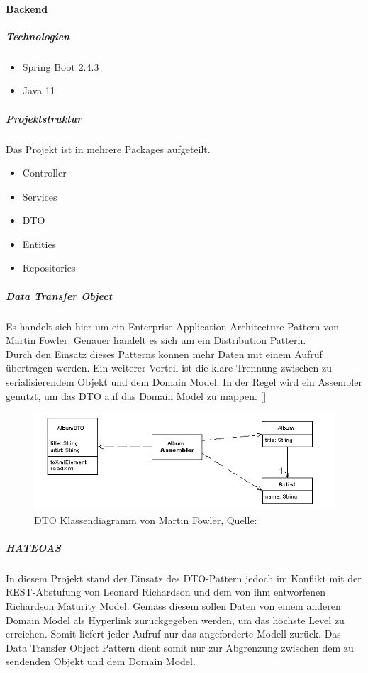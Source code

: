 \paragraph{Backend}
\subparagraph{Technologien}
\begin{itemize}
	\item Spring Boot 2.4.3
	\item Java 11
\end{itemize}
\subparagraph{Projektstruktur}
Das Projekt ist in mehrere Packages aufgeteilt. 
\begin{itemize}
	\item Controller
	\item Services
	\item DTO
	\item Entities
	\item Repositories
\end{itemize}
\newpage
\subparagraph{Data Transfer Object}\label{DTO}
Es handelt sich hier um ein Enterprise Application Architecture Pattern von Martin Fowler. Genauer handelt es sich um ein Distribution Pattern. \\
Durch den Einsatz dieses Patterns können mehr Daten mit einem Aufruf übertragen werden. Ein weiterer Vorteil ist die klare Trennung zwischen zu serialisierendem Objekt und dem Domain Model. In der Regel wird ein Assembler genutzt, um das DTO auf das Domain Model zu mappen. [\cite{dtoFowler}]
\begin{figure}[H]
	\centering
	\includegraphics[width=1\textwidth]{images/dtoSketch.png}
	\caption[DTO Klassendiagramm von Martin Fowler]{DTO Klassendiagramm von Martin Fowler, Quelle: \cite{dtoFowler}}
	\label{img: dtoFowler}
\end{figure}
\subparagraph{\ac{HATEOAS}}
In diesem Projekt stand der Einsatz des DTO-Pattern jedoch im Konflikt mit der REST-Abstufung von Leonard Richardson und dem von ihm entworfenen Richardson Maturity Model. Gemäss diesem sollen Daten von einem anderen Domain Model als Hyperlink zurückgegeben werden, um das höchste Level zu erreichen. Somit liefert jeder Aufruf nur das angeforderte Modell zurück. Das Data Transfer Object Pattern dient somit nur zur Abgrenzung zwischen dem zu sendenden Objekt und dem Domain Model. 
